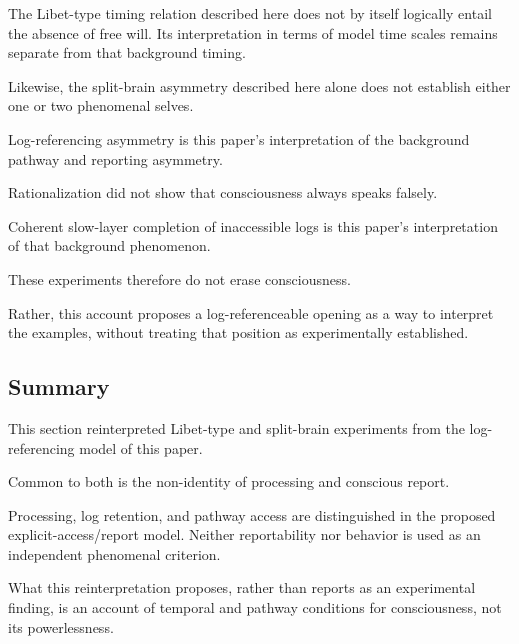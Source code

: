 The Libet-type timing relation described here does not by itself logically entail the absence of free will. Its interpretation in terms of model time scales remains separate from that background timing.

Likewise, the split-brain asymmetry described here alone does not establish either one or two phenomenal selves.

Log-referencing asymmetry is this paper's interpretation of the background pathway and reporting asymmetry.

Rationalization did not show that consciousness always speaks falsely.

Coherent slow-layer completion of inaccessible logs is this paper's interpretation of that background phenomenon.

These experiments therefore do not erase consciousness.

Rather, this account proposes a log-referenceable opening as a way to interpret the examples, without treating that position as experimentally established.

\subsection{Summary}


This section reinterpreted Libet-type and split-brain experiments from the log-referencing model of this paper.

Common to both is the non-identity of processing and conscious report.

Processing, log retention, and pathway access are distinguished in the proposed explicit-access/report model. Neither reportability nor behavior is used as an independent phenomenal criterion.

What this reinterpretation proposes, rather than reports as an experimental finding, is an account of temporal and pathway conditions for consciousness, not its powerlessness.
